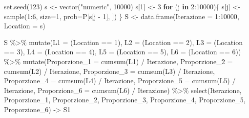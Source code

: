 \documentclass[
  10pt,
  italian,
  a4paper,
  extrafontsizes,onecolumn,openright
  ]{memoir}
\newenvironment{Shaded}{\begin{snugshade}}{\end{snugshade}}
\newcommand{\AttributeTok}[1]{\textcolor[rgb]{0.77,0.63,0.00}{#1}}
\newcommand{\ControlFlowTok}[1]{\textcolor[rgb]{0.13,0.29,0.53}{\textbf{#1}}}
\newcommand{\DecValTok}[1]{\textcolor[rgb]{0.00,0.00,0.81}{#1}}
\newcommand{\FunctionTok}[1]{\textcolor[rgb]{0.00,0.00,0.00}{#1}}
\newcommand{\NormalTok}[1]{#1}
\newcommand{\OtherTok}[1]{\textcolor[rgb]{0.56,0.35,0.01}{#1}}
\newcommand{\SpecialCharTok}[1]{\textcolor[rgb]{0.00,0.00,0.00}{#1}}
\newcommand{\StringTok}[1]{\textcolor[rgb]{0.31,0.60,0.02}{#1}}
\begin{document}
\begin{Shaded}
\begin{Highlighting}[]
\FunctionTok{set.seed}\NormalTok{(}\DecValTok{123}\NormalTok{)}
\NormalTok{s }\OtherTok{\textless{}{-}} \FunctionTok{vector}\NormalTok{(}\StringTok{"numeric"}\NormalTok{, }\DecValTok{10000}\NormalTok{)}
\NormalTok{s[}\DecValTok{1}\NormalTok{] }\OtherTok{\textless{}{-}} \DecValTok{3}
\ControlFlowTok{for}\NormalTok{ (j }\ControlFlowTok{in} \DecValTok{2}\SpecialCharTok{:}\DecValTok{10000}\NormalTok{)\{}
\NormalTok{  s[j] }\OtherTok{\textless{}{-}} \FunctionTok{sample}\NormalTok{(}\DecValTok{1}\SpecialCharTok{:}\DecValTok{6}\NormalTok{, }\AttributeTok{size=}\DecValTok{1}\NormalTok{, }\AttributeTok{prob=}\NormalTok{P[s[j }\SpecialCharTok{{-}} \DecValTok{1}\NormalTok{], ])}
\NormalTok{\}}
\NormalTok{S }\OtherTok{\textless{}{-}} \FunctionTok{data.frame}\NormalTok{(}\AttributeTok{Iterazione =} \DecValTok{1}\SpecialCharTok{:}\DecValTok{10000}\NormalTok{,}
                \AttributeTok{Location =}\NormalTok{ s)}

\NormalTok{S }\SpecialCharTok{\%\textgreater{}\%} \FunctionTok{mutate}\NormalTok{(}\AttributeTok{L1 =}\NormalTok{ (Location }\SpecialCharTok{==} \DecValTok{1}\NormalTok{),}
             \AttributeTok{L2 =}\NormalTok{ (Location }\SpecialCharTok{==} \DecValTok{2}\NormalTok{),}
             \AttributeTok{L3 =}\NormalTok{ (Location }\SpecialCharTok{==} \DecValTok{3}\NormalTok{),}
             \AttributeTok{L4 =}\NormalTok{ (Location }\SpecialCharTok{==} \DecValTok{4}\NormalTok{),}
             \AttributeTok{L5 =}\NormalTok{ (Location }\SpecialCharTok{==} \DecValTok{5}\NormalTok{),}
             \AttributeTok{L6 =}\NormalTok{ (Location }\SpecialCharTok{==} \DecValTok{6}\NormalTok{))  }\SpecialCharTok{\%\textgreater{}\%}
  \FunctionTok{mutate}\NormalTok{(}\AttributeTok{Proporzione\_1 =} \FunctionTok{cumsum}\NormalTok{(L1) }\SpecialCharTok{/}\NormalTok{ Iterazione,}
         \AttributeTok{Proporzione\_2 =} \FunctionTok{cumsum}\NormalTok{(L2) }\SpecialCharTok{/}\NormalTok{ Iterazione,}
         \AttributeTok{Proporzione\_3 =} \FunctionTok{cumsum}\NormalTok{(L3) }\SpecialCharTok{/}\NormalTok{ Iterazione,}
         \AttributeTok{Proporzione\_4 =} \FunctionTok{cumsum}\NormalTok{(L4) }\SpecialCharTok{/}\NormalTok{ Iterazione,}
         \AttributeTok{Proporzione\_5 =} \FunctionTok{cumsum}\NormalTok{(L5) }\SpecialCharTok{/}\NormalTok{ Iterazione,}
         \AttributeTok{Proporzione\_6 =} \FunctionTok{cumsum}\NormalTok{(L6) }\SpecialCharTok{/}\NormalTok{ Iterazione) }\SpecialCharTok{\%\textgreater{}\%}
  \FunctionTok{select}\NormalTok{(Iterazione, Proporzione\_1, Proporzione\_2, Proporzione\_3,}
\NormalTok{         Proporzione\_4, Proporzione\_5, Proporzione\_6) }\OtherTok{{-}\textgreater{}}\NormalTok{ S1}


\end{Highlighting}
\end{Shaded}
\end{document}
